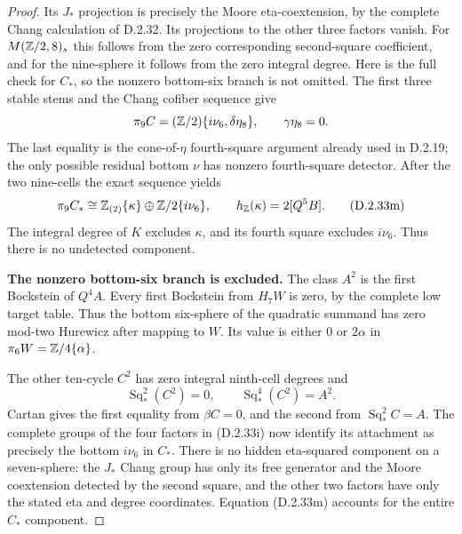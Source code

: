 \begin{proof}
Its $J_*$ projection is precisely the Moore eta-coextension,
by the complete Chang calculation of \textup{D.2.32}.
Its projections to the other three factors vanish.
For $M(\mathbb Z/2,8)_s$ this follows from the zero corresponding
second-square coefficient, and for the nine-sphere it follows
from the zero integral degree. Here is the full check for $C_*$,
so the nonzero bottom-six branch is not omitted.
The first three stable stems and the Chang cofiber sequence give
\[
 \pi_9C=(\mathbb Z/2)\{i\nu_6,\delta\eta_8\},
 \qquad \gamma\eta_8=0.
\]
The last equality is the cone-of-$\eta$ fourth-square argument
already used in \textup{D.2.19}; the only possible residual
bottom $\nu$ has nonzero fourth-square detector.
After the two nine-cells the exact sequence yields
\[
 \pi_9C_*\cong\mathbb Z_{(2)}\{\kappa\}\oplus\mathbb Z/2\{i\nu_6\},
               \qquad h_{\mathbb Z}(\kappa)=2[Q^5B].
 \tag{D.2.33m}
\]
The integral degree of $K$ excludes $\kappa$, and its fourth
square excludes $i\nu_6$. Thus there is no undetected component.

\medskip\noindent
\textbf{The nonzero bottom-six branch is excluded.}
The class $A^2$ is the first Bockstein of $Q^4A$.
Every first Bockstein from $H_7W$ is zero, by the complete
low target table. Thus the bottom six-sphere of the quadratic
summand has zero mod-two Hurewicz after mapping to $W$.
Its value is either $0$ or $2\alpha$ in
$\pi_6W=\mathbb Z/4\{\alpha\}$.

The other ten-cycle $C^2$ has zero integral ninth-cell degrees and
\[
 \operatorname{Sq}_*^2(C^2)=0,
       \qquad \operatorname{Sq}_*^4(C^2)=A^2.
 \tag{D.2.33p1}
\]
Cartan gives the first equality from $\beta C=0$, and the
second from $\operatorname{Sq}_*^2C=A$.
The complete groups of the four factors in
\textup{(D.2.33i)} now identify its attachment as precisely
the bottom $i\nu_6$ in $C_*$.
There is no hidden eta-squared component on a seven-sphere:
the $J_*$ Chang group has only its free generator and the
Moore coextension detected by the second square, and the
other two factors have only the stated eta and degree
coordinates. Equation \textup{(D.2.33m)} accounts for the
entire $C_*$ component.


\end{proof}
